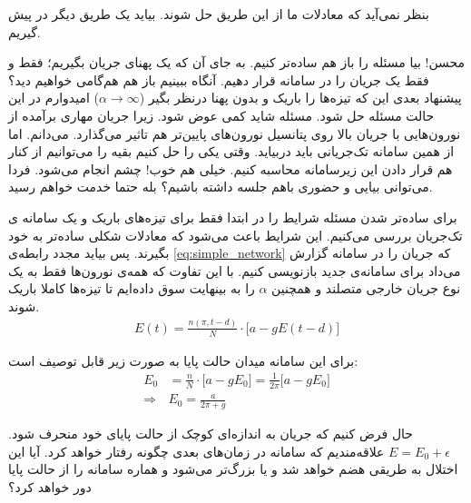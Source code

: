 
بنظر نمی‌آید که معادلات ما از این طریق حل شوند. بیاید یک طریق دیگر در پیش گیریم.

\begin{mohsenletter}
	
	محسن! بیا مسئله را باز هم ساده‌تر کنیم. به جای آن که یک پهنای جریان بگیریم؛ فقط و فقط یک جریان را در سامانه قرار دهیم. آنگاه ببینیم باز هم هم‌گامی خواهیم دید؟\\
	پیشنهاد بعدی این که تیزه‌ها را باریک و بدون پهنا درنظر بگیر
	($\alpha \rightarrow \infty$)
	امیدوارم در این حالت مسئله حل شود.
	\medskip
	مسئله شاید کمی عوض شود. زیرا جریان مهاری برآمده از نورون‌هایی با جریان بالا روی پتانسیل نورون‌های پایین‌تر هم تاثیر می‌گذارد.
	می‌دانم. اما از همین سامانه تک‌جریانی باید دربیاید. وقتی یکی را حل کنیم بقیه را می‌توانیم از کنار هم قرار دادن این زیرسامانه محاسبه کنیم.
	خیلی هم خوب! چشم انجام می‌شود.
	فردا می‌توانی بیایی و حضوری باهم جلسه داشته باشیم؟
	بله حتما خدمت خواهم رسید.
\end{mohsenletter}

برای ساده‌تر شدن مسئله شرایط را در ابتدا فقط برای تیزه‌های باریک و یک سامانه ی تک‌جریان بررسی می‌کنیم. این شرایط باعث می‌شود که معادلات شکلی ساده‌تر به خود بگیرند. پس بیاید مجدد رابطه‌ی 
\ref{eq:simple_network}
که جریان را در سامانه گزارش می‌داد برای سامانه‌ی جدید بازنویسی کنیم. با این تفاوت که همه‌ی نورون‌ها فقط به یک نوع جریان خارجی متصلند و همچنین $\alpha$ را به بینهایت سوق داده‌ایم تا تیزه‌ها کاملا باریک شوند.
\begin{align}
	E(t) = \frac{n(\pi,t-d)}{N} \cdot \big[ a - g E(t-d) \big]
\end{align}

برای این سامانه میدان حالت پایا به صورت زیر قابل توصیف است:
\begin{align}
	E_0 &= \frac{n}{N} \cdot \big[ a - g E_0 \big] = \frac{1}{2\pi}\big[ a - g E_0 \big]\\
	\Rightarrow  & E_0 = \frac{a}{2\pi + g}
\end{align}

حال فرض کنیم که جریان به اندازه‌ای کوچک از حالت پایای خود منحرف ‌شود.
$E = E_0 + \epsilon$
علاقه‌مندیم که سامانه در زمان‌های بعدی چگونه رفتار خواهد کرد. آیا این اختلال به طریقی هضم خواهد شد و یا بزرگ‌تر می‌شود و هماره سامانه را از حالت پایا دور خواهد کرد؟

